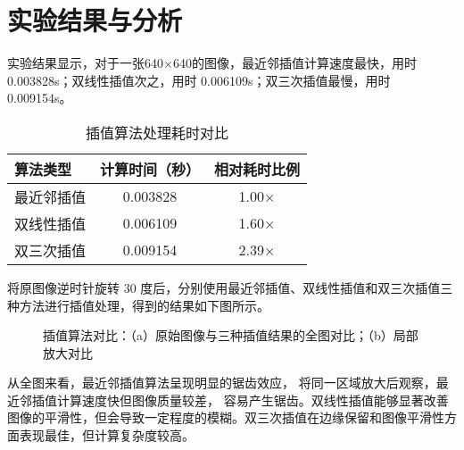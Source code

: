 \documentclass[UTF8]{ctexart}
\begin{document}
%     

%     
\section{实验结果与分析}
实验结果显示，对于一张640$\times$640的图像，最近邻插值计算速度最快，用时 0.003828s；双线性插值次之，用时 0.006109s；双三次插值最慢，用时 0.009154s。
\begin{table}[htbp]
    \centering 
    \caption{插值算法处理耗时对比}
    \label{tab:time}
    \begin{tabular}{lcc}
    \hline 
    算法类型 & 计算时间（秒） & 相对耗时比例 \\ \hline 
    最近邻插值 & 0.003828 & 1.00× \\
    双线性插值 & 0.006109 & 1.60× \\
    双三次插值 & 0.009154 & 2.39× \\ \hline 
    \end{tabular}
    \end{table}

将原图像逆时针旋转 30 度后，分别使用最近邻插值、双线性插值和双三次插值三种方法进行插值处理，得到的结果如下图所示。
\begin{figure}[htbp]
    \centering 
    \subfloat[全图对比]{
    
    \label{fig:contrast}
    }
    \subfloat[局部放大]{
    
    \label{fig:zoom}
    }
    \caption{插值算法对比：（a）原始图像与三种插值结果的全图对比；（b）局部放大对比}
\end{figure}
从全图来看，最近邻插值算法呈现明显的锯齿效应，
将同一区域放大后观察，最近邻插值计算速度快但图像质量较差，
容易产生锯齿。双线性插值能够显著改善图像的平滑性，但会导致一定程度的模糊。双三次插值在边缘保留和图像平滑性方面表现最佳，但计算复杂度较高。
\end{document}

